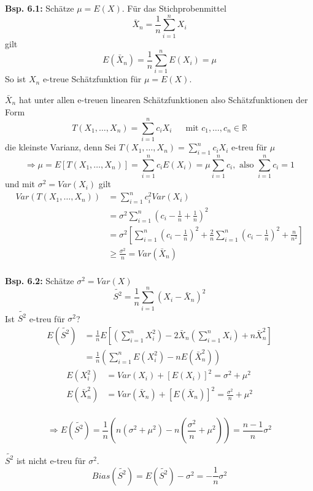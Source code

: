 \documentclass[a4paper,11pt]{article}
\begin{document}
\vspace{6pt}
\noindent\textbf{Bsp. 6.1:} Schätze $\mu=E(X)$. 
\newline Für das Stichprobenmittel
\[\bar{X}_n=\frac{1}{n}\sum_{i=1}^{n}X_i\]
gilt
\[E(\bar{X}_n)=\frac{1}{n}\sum_{i=1}^{n}E(X_i)=\mu\]
So ist $X_n$ e-treue Schätzfunktion für $\mu=E(X)$. 

$\bar{X}_n$ hat unter allen e-treuen linearen Schätzfunktionen also Schätzfunktionen der Form
\[T(X_1,\dots,X_n)=\sum_{i=1}^{n}c_iX_i\hspace{15pt}\text{ mit }c_1,\dots,c_n\in\mathbb{R}\]
die kleinste Varianz, denn
\newline Sei $T(X_1,\dots,X_n)=\sum_{i=1}^{n}c_iX_i$ e-treu für $\mu$
\[\Rightarrow \mu=E[T(X_1,\dots,X_n)]=\sum_{i=1}^{n}c_iE(X_i)=\mu\sum_{i=1}^{n}c_i, \text{ also }\sum_{i=1}^{n}c_i=1\]
und mit $\sigma^2=Var(X_i)$ gilt 
\begin{align*}
Var(T(X_1,\dots,X_n)) &= \sum_{i=1}^{n}c_i^2Var(X_i)\\
&= \sigma^2\sum_{i=1}^{n}(c_i-\frac{1}{n}+\frac{1}{n})^2\\
&= \sigma^2[\sum_{i=1}^{n}(c_i-\frac{1}{n})^2+\frac{2}{n}\sum_{i=1}^{n}(c_i-\frac{1}{n})^2+\frac{n}{n^2}]\\
&\geq \frac{\sigma^2}{n}=Var(\bar{X}_n)\\
\end{align*}

\vspace{6pt}
\noindent\textbf{Bsp. 6.2:} Schätze $\sigma^2=Var(X)$
\[\tilde{S^2}=\frac{1}{n}\sum_{i=1}^{n}(X_i-\bar{X}_n)^2\]
Ist $\tilde{S^2}$ e-treu für $\sigma^2$?
\begin{align*}
E(\tilde{S^2}) &= \frac{1}{n}E[(\sum_{i=1}^{n}X_i^2)-2\bar{X}_n(\sum_{i=1}^{n}X_i)+n\bar{X}_n^2]\\
&= \frac{1}{n}(\sum_{i=1}^{n}E(X_i^2)-nE(\bar{X}_n^2))
\end{align*}
\begin{align*}
E(X_i^2) &= Var(X_i)+[E(X_i)]^2=\sigma^2+\mu^2\\
E(\bar{X}_n^2) &= Var(\bar{X}_n)+[E(\bar{X}_n)]^2=\frac{\sigma^2}{n}+\mu^2\\
\end{align*}

\[\Rightarrow E(\tilde{S^2})=\frac{1}{n}(n(\sigma^2+\mu^2)-n(\frac{\sigma^2}{n}+\mu^2))=\frac{n-1}{n}\sigma^2\]

\noindent $\tilde{S^2}$ ist nicht e-treu für $\sigma^2$.
\[Bias(\tilde{S^2})=E(\tilde{S^2})-\sigma^2=-\frac{1}{n}\sigma^2\]
\end{document}
